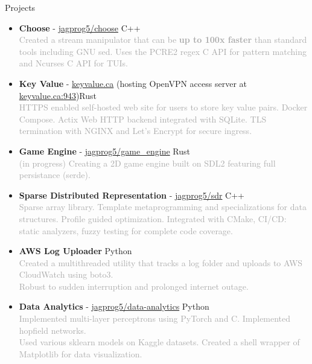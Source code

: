 \documentclass{resume} %
\begin{document}
\begin{rSection}{Projects}
    \begin{itemize}
        \setlength\itemsep{-0.2em}
        \item {\bf Choose} - \href{https://github.com/jagprog5/choose/}{jagprog5/choose} \hfill C++\\
        \textcolor{darkgray}{Created a stream manipulator that can be \textbf{up to 100x faster} than standard tools including GNU sed.
        Uses the PCRE2 regex C API for pattern matching and Ncurses C API for TUIs.}
        \item {\bf Key Value} - \href{http://www.keyvalue.ca/}{keyvalue.ca} (hosting OpenVPN access server at \href{keyvalue.ca:943}{keyvalue.ca:943})\hfill Rust\\
        \textcolor{darkgray}{HTTPS enabled self-hosted web site for users to store key value pairs. Docker Compose. Actix Web HTTP backend integrated with SQLite. TLS termination with NGINX and Let's Encrypt for secure ingress.}
        \item {\bf Game Engine} - \href{https://github.com/jagprog5/game_engine/}{jagprog5/game\_engine} \hfill Rust\\
        \textcolor{darkgray}{(in progress) Creating a 2D game engine built on SDL2 featuring full persistance (serde).}
        \item {\bf Sparse Distributed Representation} - \href{https://github.com/jagprog5/SDR/}{jagprog5/sdr} \hfill C++\\
        \textcolor{darkgray}{Sparse array library. Template metaprogramming and specializations for data structures. Profile guided optimization. Integrated with CMake, CI/CD: static analyzers, fuzzy testing for complete code coverage.}
        \item {\bf AWS Log Uploader} \hfill Python\\
        \textcolor{darkgray}{Created a multithreaded utility that tracks a log folder and uploads to AWS CloudWatch using boto3.\\
        Robust to sudden interruption and prolonged internet outage.}
        \item {\bf Data Analytics} - \href{https://github.com/jagprog5/resume/blob/main/data-analytics-projects.md}{jagprog5/data-analytics} \hfill Python\\
        \textcolor{darkgray}{Implemented multi-layer perceptrons using PyTorch and C. Implemented hopfield networks.\\
        Used various sklearn models on Kaggle datasets. Created a shell wrapper of Matplotlib for data visualization.}
    \end{itemize}
\end{rSection}
\end{document}
